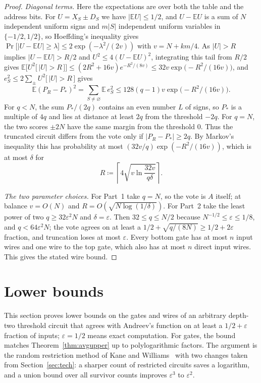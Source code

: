 \documentclass[11pt,letterpaper]{article}
\theoremstyle{remark}
\newcommand{\ind}[1]{\bigl[\,#1\,\bigr]}
\begin{document}
\begin{proof}
\emph{Diagonal terms.}
Here the expectations are over both the table and the address bits.
For $U=X_S\pm D_S$ we have $|\mathbb EU|\le1/2$, and $U-\mathbb EU$ is a sum
of $N$ independent uniform signs and $m|S|$ independent uniform
variables in $\{-1/2,1/2\}$, so Hoeffding's inequality
gives $\Pr\bigl[|U-\mathbb EU|\ge\lambda\bigr]\le2\exp(-\lambda^2/(2v))$ with
$v=N+km/4$. As $|U|>R$ implies $|U-\mathbb EU|>R/2$ and
$U^2\le4(U-\mathbb EU)^2$, integrating this tail from $R/2$ gives
$\mathbb E\bigl[U^2\ind{|U|>R}\bigr]\le(2R^2+16v)e^{-R^2/(8v)}
\le32v\exp\bigl(-R^2/(16v)\bigr)$, and $e_S^2\le2\sum_\pm U^2\ind{|U|>R}$
gives
\[
\mathbb E(P_R-P_*)^2=\sum_{S\ne\varnothing}\mathbb E\,e_S^2
\le128(q-1)v\exp\bigl(-R^2/(16v)\bigr).
\]
For $q<N$, the sum $P_*/(2q)$ contains an even number $L$ of signs, so
$P_*$ is a multiple of $4q$ and lies at distance at least $2q$ from the
threshold $-2q$. For $q=N$, the two scores $\pm2N$ have the same margin
from the threshold $0$. Thus the truncated circuit
differs from the vote only if $|P_R-P_*|\ge2q$. By Markov's inequality this
has probability at most $(32v/q)\exp(-R^2/(16v))$, which is at most $\delta$
for
\[
R\coloneqq\left\lceil4\sqrt{v\ln\frac{32v}{q\delta}}\right\rceil .
\]

\emph{The two parameter choices.}
For Part~1 take $q=N$, so the vote is $A$ itself; at balance $v=O(N)$ and
$R=O(\sqrt{N\log(1/\delta)})$. For Part~2 take the least power of two
$q\ge32\varepsilon^2N$ and $\delta=\varepsilon$. Then $32\le q\le N/2$
because $N^{-1/2}\le\varepsilon\le1/8$, and $q<64\varepsilon^2N$; the vote
agrees on at least a $1/2+\sqrt{q/(8N)}\ge1/2+2\varepsilon$ fraction, and
truncation loses at most $\varepsilon$. Every bottom gate has at most $n$
input wires and one wire to the top
gate, which also has at most $n$ direct input wires. This gives the stated
wire bound.
\end{proof}


\section{Lower bounds}\label{sec:lower}

This section proves lower bounds on the gates and wires of an arbitrary
depth-two threshold circuit that agrees with Andreev's function on at least a
$1/2+\varepsilon$ fraction of inputs; $\varepsilon=1/2$ means exact computation.
For gates, the bound matches Theorem~\ref{thm:avgupper} up to
polylogarithmic factors. The argument is the random restriction method of
Kane and Williams~\cite{KW} with two changes taken from
Section~\ref{sec:tech}: a sharper count of restricted circuits saves a
logarithm, and a union bound over all survivor counts improves
$\varepsilon^3$ to $\varepsilon^2$.
\end{document}
